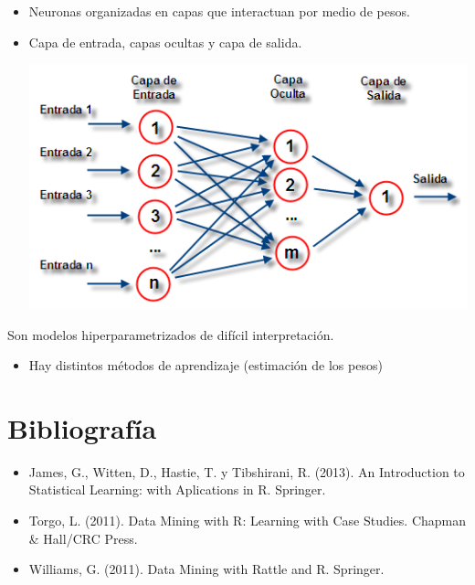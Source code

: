 \documentclass[]{book}
\providecommand{\tightlist}{%
  \setlength{\itemsep}{0pt}\setlength{\parskip}{0pt}}
\begin{document}
\begin{itemize}
\item
  Neuronas organizadas en capas que interactuan por medio de pesos.
\item
  Capa de entrada, capas ocultas y capa de salida.

  \includegraphics[width=6.88in]{images/nn}
\end{itemize}

Son modelos hiperparametrizados de difícil interpretación.

\begin{itemize}
\tightlist
\item
  Hay distintos métodos de aprendizaje (estimación de los pesos)
\end{itemize}

\section{Bibliografía}\label{bibliografia}

\begin{itemize}
\item
  James, G., Witten, D., Hastie, T. y Tibshirani, R. (2013). An
  Introduction to Statistical Learning: with Aplications in R. Springer.
\item
  Torgo, L. (2011). Data Mining with R: Learning with Case Studies.
  Chapman \& Hall/CRC Press.
\item
  Williams, G. (2011). Data Mining with Rattle and R. Springer.
\end{itemize}


\end{document}
